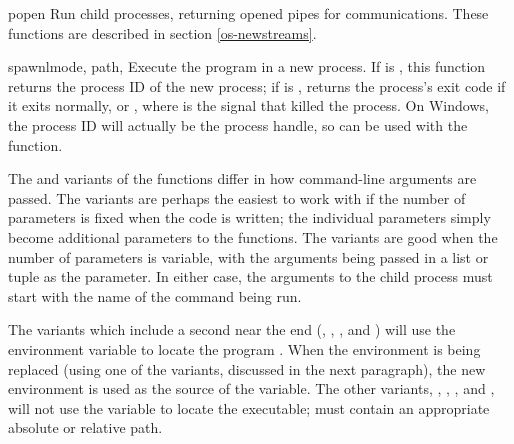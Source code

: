 \begin{funcdescni}{popen}{\unspecified}
Run child processes, returning opened pipes for communications.  These
functions are described in section \ref{os-newstreams}.
\end{funcdescni}

\begin{funcdesc}{spawnl}{mode, path, \moreargs}
Execute the program  in a new process.  If  is
, this function returns the process ID of the new
process; if  is , returns the process's
exit code if it exits normally, or , where
 is the signal that killed the process.  On Windows, the
process ID will actually be the process handle, so can be used with
the  function.

The  and  variants of the
 functions differ in how command-line arguments are
passed.  The  variants are perhaps the easiest to work
with if the number of parameters is fixed when the code is written;
the individual parameters simply become additional parameters to the
 functions.  The  variants are good
when the number of parameters is variable, with the arguments being
passed in a list or tuple as the  parameter.  In either
case, the arguments to the child process must start with the name of
the command being run.

The variants which include a second  near the end
(, , ,
and ) will use the  environment
variable to locate the program .  When the environment is
being replaced (using one of the  variants,
discussed in the next paragraph), the new environment is used as the
source of the  variable.  The other variants,
, , , and
, will not use the  variable to
locate the executable;  must contain an appropriate absolute
or relative path.


\end{funcdesc}

